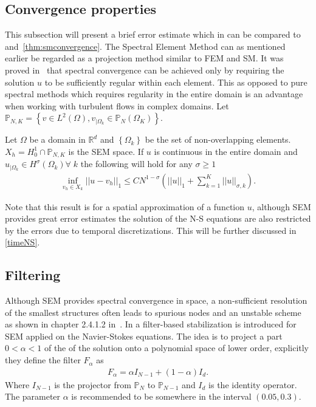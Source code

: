 
\subsection{Convergence properties}
This subsection will present a brief error estimate which in can be 
compared to  and~\ref{thm:smconvergence}.
The Spectral Element Method can as mentioned earlier be regarded as a projection 
method similar to FEM and SM. 
It was proved in~\cite{MPR1987} that spectral convergence can be achieved only by requiring the solution
$u$ to be sufficiently regular within each element. This as opposed to pure spectral methods which
requires regularity in the entire domain is an advantage when working with turbulent flows 
in complex domains.
Let $\mathbb{P}_{N,K} = \left\{ v \in L^2(\Omega),v_{|\Omega_k} \in \mathbb{P}_N(\Omega_K) \right\}$.
\begin{theorem}
    Let $\Omega$ be a domain in $\mathbb{R}^d$ and $\left\{ \Omega_k \right\}$ 
    be the set of non-overlapping elements. $X_h = H^1_0\cap\mathbb{P}_{N,K}$ is the SEM space. If $u$ is continuous in the entire domain 
    and $u_{|\Omega_k} \in H^{\sigma}(\Omega_k) \forall \; k $ the following will hold for 
    any $\sigma \ge 1$
\begin{align}
    \inf_{v_{h}\in X_{k}}||u-v_h||_1 \le CN^{1-\sigma}\left( ||u||_1 + \sum_{k=1}^{K}||u||_{\sigma,k} \right).
\end{align}
    \label{thm:semconvergence}
\end{theorem}
%

Note that this result is for a spatial approximation of a function $u$, although SEM provides 
great error estimates the solution of the N-S equations are also restricted by the errors due to 
temporal discretizations. This will be further discussed in \cref{timeNS}.
\subsection{Filtering} \label{filtering}
Although SEM provides spectral convergence in space,
a non-sufficient resolution of the smallest structures
often leads to spurious nodes and an unstable scheme 
as shown in chapter 2.4.1.2 in~\cite{Karniadakis}. In \cite{FischerMullen} a filter-based 
stabilization is introduced for SEM applied on 
the Navier-Stokes equations. The idea is to project a part $ 0 <\alpha < 1$ 
of the of the solution onto a polynomial space of lower order, 
explicitly they define the filter $F_{\alpha}$ as 
%
\begin{align}
    F_{\alpha}= \alpha I_{N-1}  + (1-\alpha) I_d.
    \label{eq:filter}
\end{align}
%
Where $I_{N-1}$ is the projector from $\mathbb{P}_N$ to $\mathbb{P}_{N-1}$ and $ I_d$ is the identity operator.
The parameter $\alpha$ is recommended to be somewhere in the interval $(0.05,0.3)$.

